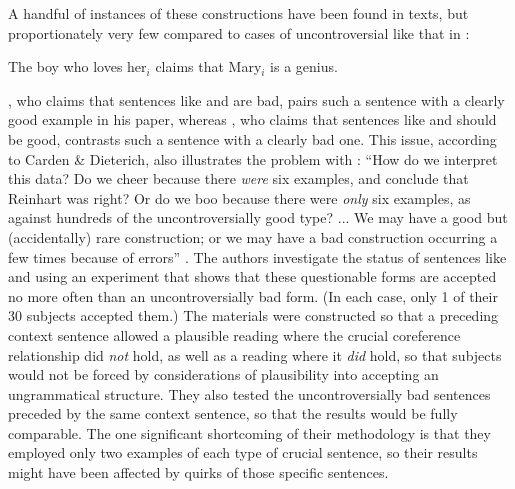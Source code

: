 \noindent
A handful of instances of these constructions have been found in texts, but proportionately very few compared to cases of uncontroversial  like that in :

\ea\label{ex:1:3}
The boy who loves her$_i$ claims that Mary$_i$ is a genius.
\z

\noindent
\citet{Langacker1969}, who claims that sentences like  and  are bad, pairs such a sentence with a clearly good example in his paper, whereas \citet{Reinhart1976}, who claims that sentences like  and  should be good, contrasts such a sentence with a clearly bad one. This issue, according to Carden \& Dieterich, also illustrates the problem with : ``How do we interpret this data? Do we cheer because there \textit{were} six examples, and conclude that Reinhart was right? Or do we boo because there were \textit{only} six examples, as against hundreds of the uncontroversially good type? ... We may have a good but (accidentally) rare construction; or we may have a bad construction occurring a few times because of errors'' \citep[591]{CardenEtAl1981}. The authors investigate the status of sentences like  and  using an experiment that shows that these questionable forms are accepted no more often than an uncontroversially bad form. (In each case, only 1 of their 30 subjects accepted them.) The materials were constructed so that a preceding context sentence allowed a plausible reading where the crucial coreference relationship did \textit{not} hold, as well as a reading where it \textit{did} hold, so that subjects would not be forced by considerations of plausibility  into accepting an ungrammatical structure. They also tested the uncontroversially  bad sentences preceded by the same context sentence, so that the results would be fully comparable. The one significant shortcoming of their methodology is that they employed only two examples of each type of crucial sentence, so their results  might have been affected by quirks of those specific sentences.

